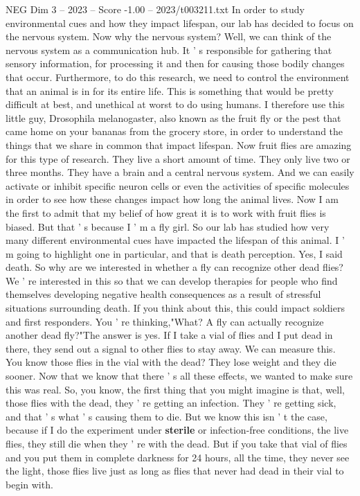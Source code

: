 \begin{textsample}{NEG Dim 3 – 2023 – Score -1.00 – 2023/t003211.txt}
In order to study environmental cues and how they impact lifespan, our lab has decided to focus on the nervous system.
Now why the nervous system?
Well, we can think of the nervous system as a communication hub.
It ' s responsible for gathering that sensory information, for processing it and then for causing those bodily changes that occur.
Furthermore, to do this research, we need to control the environment that an animal is in for its entire life.
This is something that would be pretty difficult at best, and unethical at worst to do using humans.
I therefore use this little guy, Drosophila melanogaster, also known as the fruit fly or the pest that came home on your bananas from the grocery store, in order to understand the things that we share in common that impact lifespan.
Now fruit flies are amazing for this type of research.
They live a short amount of time.
They only live two or three months.
They have a brain and a central nervous system.
And we can easily activate or inhibit specific neuron cells or even the activities of specific molecules in order to see how these changes impact how long the animal lives.
Now I am the first to admit that my belief of how great it is to work with fruit flies is biased.
But that ' s because I ' m a fly girl.
So our lab has studied how very many different environmental cues have impacted the lifespan of this animal.
I ' m going to highlight one in particular, and that is death perception.
Yes, I said death.
So why are we interested in whether a fly can recognize other dead flies?
We ' re interested in this so that we can develop therapies for people who find themselves developing negative health consequences as a result of stressful situations surrounding death.
If you think about this, this could impact soldiers and first responders.
You ' re thinking,"What?
A fly can actually recognize another dead fly?"The answer is yes.
If I take a vial of flies and I put dead in there, they send out a signal to other flies to stay away.
We can measure this.
You know those flies in the vial with the dead?
They lose weight and they die sooner.
Now that we know that there ' s all these effects, we wanted to make sure this was real.
So, you know, the first thing that you might imagine is that, well, those flies with the dead, they ' re getting an infection.
They ' re getting sick, and that ' s what ' s causing them to die.
But we know this isn ' t the case, because if I do the experiment under \textbf{sterile} or infection-free conditions, the live flies, they still die when they ' re with the dead.
But if you take that vial of flies and you put them in complete darkness for 24 hours, all the time, they never see the light, those flies live just as long as flies that never had dead in their vial to begin with.

\end{textsample}
